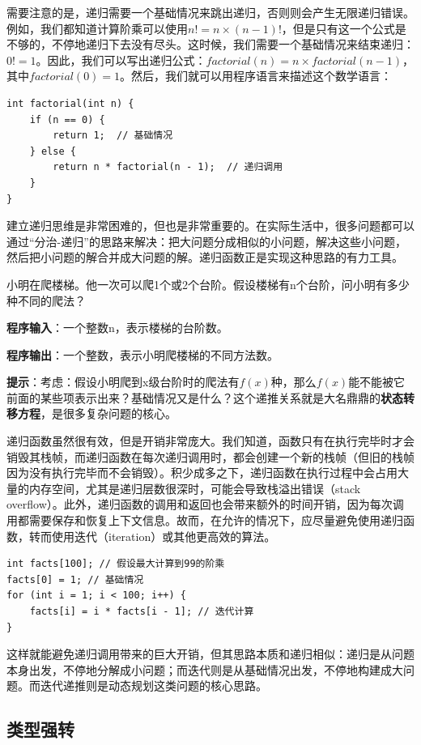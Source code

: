 需要注意的是，递归需要一个基础情况来跳出递归，否则则会产生无限递归错误。例如，我们都知道计算阶乘可以使用$n!=n\times(n-1)!$，但是只有这一个公式是不够的，不停地递归下去没有尽头。这时候，我们需要一个基础情况来结束递归：$0!=1$。因此，我们可以写出递归公式：$factorial(n) = n \times factorial(n-1)$，其中$factorial(0) = 1$。然后，我们就可以用程序语言来描述这个数学语言：
\begin{verbatim}
int factorial(int n) {
    if (n == 0) {
        return 1;  // 基础情况
    } else {
        return n * factorial(n - 1);  // 递归调用
    }
}
\end{verbatim}

建立递归思维是非常困难的，但也是非常重要的。在实际生活中，很多问题都可以通过“分治-递归”的思路来解决：把大问题分成相似的小问题，解决这些小问题，然后把小问题的解合并成大问题的解。递归函数正是实现这种思路的有力工具。

\begin{exercise}[小明爬楼梯]
    小明在爬楼梯。他一次可以爬1个或2个台阶。假设楼梯有n个台阶，问小明有多少种不同的爬法？

    \textbf{程序输入}：一个整数n，表示楼梯的台阶数。

    \textbf{程序输出}：一个整数，表示小明爬楼梯的不同方法数。

    \textbf{提示}：考虑：假设小明爬到x级台阶时的爬法有$f(x)$种，那么$f(x)$能不能被它前面的某些项表示出来？基础情况又是什么？这个递推关系就是大名鼎鼎的\textbf{状态转移方程}，是很多复杂问题的核心。
\end{exercise}

递归函数虽然很有效，但是开销非常庞大。我们知道，函数只有在执行完毕时才会销毁其栈帧，而递归函数在每次递归调用时，都会创建一个新的栈帧（但旧的栈帧因为没有执行完毕而不会销毁）。积少成多之下，递归函数在执行过程中会占用大量的内存空间，尤其是递归层数很深时，可能会导致栈溢出错误（stack overflow）。此外，递归函数的调用和返回也会带来额外的时间开销，因为每次调用都需要保存和恢复上下文信息。故而，在允许的情况下，应尽量避免使用递归函数，转而使用迭代（iteration）或其他更高效的算法。
\begin{verbatim}
int facts[100]; // 假设最大计算到99的阶乘
facts[0] = 1; // 基础情况
for (int i = 1; i < 100; i++) {
    facts[i] = i * facts[i - 1]; // 迭代计算
}
\end{verbatim}
这样就能避免递归调用带来的巨大开销，但其思路本质和递归相似：递归是从问题本身出发，不停地分解成小问题；而迭代则是从基础情况出发，不停地构建成大问题。而迭代递推则是动态规划这类问题的核心思路。

\subsection{类型强转}

